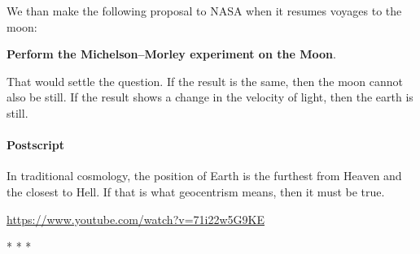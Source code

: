We than make the following proposal to NASA when it resumes voyages to the moon:

\begin{quotex}
\textbf{Perform the Michelson–Morley experiment on the Moon}. 

\end{quotex}
That would settle the question. If the result is the same, then the moon cannot also be still. If the result shows a change in the velocity of light, then the earth is still.

\paragraph{Postscript}
In traditional cosmology, the position of Earth is the furthest from Heaven and the closest to Hell. If that is what geocentrism means, then it must be true. 

\url{https://www.youtube.com/watch?v=71i22w5G9KE}




\begin{center}* * *\end{center}


